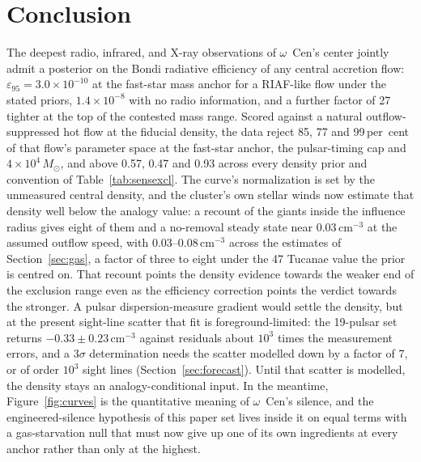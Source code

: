 \documentclass[11pt]{article}
\newcommand{\msun}{\ensuremath{M_\odot}}
\newcommand{\ocen}{$\omega$~Cen}
\newcommand{\epsl}{\ensuremath{\varepsilon_{95}}}
\begin{document}
\section{Conclusion}
\label{sec:conclusion}

The deepest radio, infrared, and X-ray observations of \ocen's center jointly admit a posterior on the Bondi radiative efficiency of any central accretion flow: $\epsl = 3.0\times10^{-10}$ at the fast-star mass anchor for a RIAF-like flow under the stated priors, $1.4\times10^{-8}$ with no radio information, and a further factor of 27 tighter at the top of the contested mass range. Scored against a natural outflow-suppressed hot flow at the fiducial density, the data reject 85, 77 and 99\,per~cent of that flow's parameter space at the fast-star anchor, the pulsar-timing cap and $4\times10^{4}\,\msun$, and above 0.57, 0.47 and 0.93 across every density prior and convention of Table~\ref{tab:sensexcl}. The curve's normalization is set by the unmeasured central density, and the cluster's own stellar winds now estimate that density well below the analogy value: a recount of the giants inside the influence radius gives eight of them and a no-removal steady state near $0.03\,\mathrm{cm^{-3}}$ at the assumed outflow speed, with 0.03--0.08\,$\mathrm{cm^{-3}}$ across the estimates of Section~\ref{sec:gas}, a factor of three to eight under the 47 Tucanae value the prior is centred on. That recount points the density evidence towards the weaker end of the exclusion range even as the efficiency correction points the verdict towards the stronger. A pulsar dispersion-measure gradient would settle the density, but at the present sight-line scatter that fit is foreground-limited: the 19-pulsar set returns $-0.33\pm0.23\,\mathrm{cm^{-3}}$ against residuals about $10^{3}$ times the measurement errors, and a $3\sigma$ determination needs the scatter modelled down by a factor of 7, or of order $10^{3}$ sight lines (Section~\ref{sec:forecast}). Until that scatter is modelled, the density stays an analogy-conditional input. In the meantime, Figure~\ref{fig:curves} is the quantitative meaning of \ocen's silence, and the engineered-silence hypothesis of this paper set lives inside it on equal terms with a gas-starvation null that must now give up one of its own ingredients at every anchor rather than only at the highest.
\end{document}
